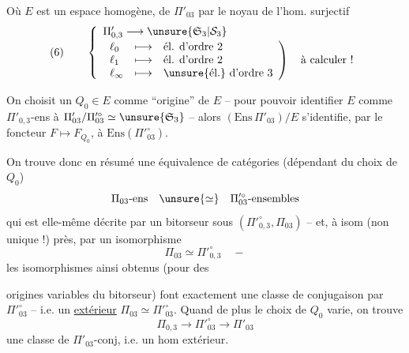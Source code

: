 Où $E$ est un espace homogène,   de $\Pi'_{03}$ par le   noyau de l'hom. surjectif 
\[
(6)\qquad
\left\{
\begin{array}{l}
\Pi'_{0,3}\longrightarrow\unsure{\mathfrak S_3|\mathcal S_3}\\[2pt]
\left.
\begin{array}{lll}
\ell_0 &\longmapsto& \text{él. d'ordre 2}\\
\ell_1 &\longmapsto& \text{él. d'ordre 2}\\
\ell_\infty &\longmapsto& \text{\unsure{él.} d'ordre 3}
\end{array}
\right)\quad\text{à calculer !}
\end{array}
\right.
\]

On choisit un $Q_0\in E$ comme ``origine'' de $E$ -- pour pouvoir identifier $E$ comme $\Pi'_{0,3}$-ens à $\Pi'_{03}/\Pi'^{\circ}_{03}\simeq\unsure{\mathfrak S_3}$ -- alors $(\mathrm{Ens}\,\Pi'_{03})/E$ s'identifie, par le foncteur $F\longmapsto F_{Q_0}$, à $\mathrm{Ens}(\Pi'^{\circ}_{03})$.

On trouve donc en résumé une équivalence de catégories (dépendant du choix de $Q_0$)
\[
\Pi_{03}\text{-ens}\quad\unsure{\simeq}\quad\Pi'^{\circ}_{03}\text{-ensembles}
\]
qui est elle-même décrite par un bitorseur sous $(\Pi'^{\circ}_{0,3},\Pi_{03})$ -- et, à isom  (non unique !) près, par un isomorphisme
\[
\Pi_{03}\simeq\Pi'^{\circ}_{0,3}\quad -
\]
les isomorphismes ainsi obtenus (pour des


origines variables du bitorseur) font exactement une classe de conjugaison par $\Pi'^{\circ}_{03}$ -- i.e. un \uline{} \uline{extérieur} $\Pi_{03}\simeq\Pi'^{\circ}_{03}$. Quand de plus le choix de $Q_0$ varie, on trouve  
\[
\Pi_{0,3}\longrightarrow\Pi'^{\circ}_{03}\longrightarrow\Pi'_{03}
\]
 une classe de $\Pi'_{03}$-conj, i.e. un hom extérieur.

